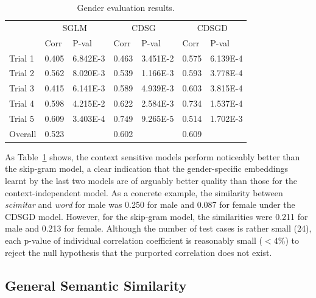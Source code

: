 \documentclass[a4paper,12pt,twoside,openright]{report}
\newcommand{\ti}{\textit}
\begin{document}
\begin{table}[h]
\centering
\begin{tabular}{lllllll}
 \multicolumn{1}{c}{}   & \multicolumn{2}{c}{SGLM} & \multicolumn{2}{c}{CDSG} & \multicolumn{2}{c}{CDSGD} \\ \cline{2-7}
        & Corr      & P-val        & Corr           & P-val             & Corr          & P-val       \\ \cline{2-7}
Trial 1 & 0.405         & 6.842E-3 &  0.463         & 3.451E-2         & 0.575     & 6.139E-4                 \\
Trial 2 & 0.562         & 8.020E-3 &  0.539         & 1.166E-3         & 0.593     & 3.778E-4                \\
Trial 3 & 0.415         & 6.141E-3 &  0.589         & 4.939E-3         & 0.603     & 3.815E-4                 \\
Trial 4 & 0.598         & 4.215E-2 &  0.622         & 2.584E-3         & 0.734     & 1.537E-4                \\
Trial 5 & 0.609         & 3.403E-4 &  0.749         & 9.265E-5         & 0.514     & 1.702E-3                 \\ \hline
\multicolumn{1}{l}{Overall}
        & 0.523         &          & 0.602          &                  & 0.609     &                    \\ \hline\end{tabular}
\caption{Gender evaluation results.}
\label{tab:chap5:gender_eval}
\end{table}

As Table~\ref{tab:chap5:gender_eval} shows, the context sensitive models perform noticeably better than the skip-gram model, a clear indication that the gender-specific embeddings learnt by the last two models are of arguably better quality than those for the context-independent model. As a concrete example, the similarity between \ti{scimitar} and \ti{word} for male was 0.250 for male and 0.087 for female under the CDSGD model. However, for the skip-gram model, the similarities were 0.211 for male and 0.213 for female. Although the number of test cases is rather small (24), each p-value of individual correlation coefficient is reasonably small ($<$4\%) to reject the null hypothesis that the purported correlation does not exist.

\subsection{General Semantic Similarity}
\end{document}
